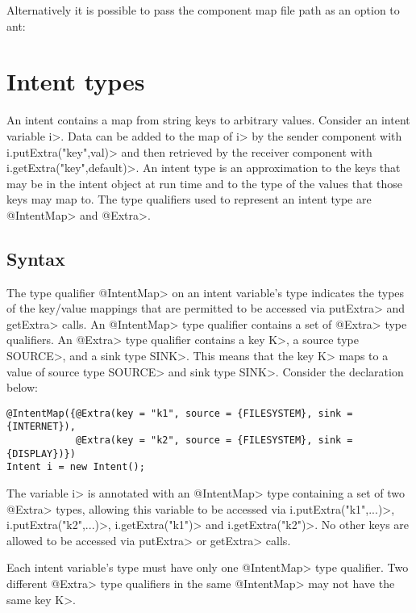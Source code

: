 
\noindent
Alternatively it is possible to pass the component map file path as an option
to ant:


\section{Intent types\label{intent-types}}
An intent contains a map from string keys to arbitrary values. Consider an
intent variable \<i>. Data can be added to the map of \<i> by
the sender component with \<i.putExtra("key",val)> and then retrieved by the
receiver component with \<i.getExtra("key",default)>. An intent type is an
approximation to the keys that may be in the intent object at run time and to
the type of the values that those keys may map to. The type qualifiers used to
represent an intent type are \<@IntentMap> and \<@Extra>.

\subsection{Syntax}
The type qualifier \<@IntentMap> on an intent variable's type indicates the
types of the key/value mappings that are permitted to be accessed via
\<putExtra> and \<getExtra> calls.
An \<@IntentMap> type qualifier contains a set of \<@Extra> type qualifiers. An
\<@Extra> type qualifier contains a key \<K>, a source type \<SOURCE>, and a 
sink type \<SINK>. This means that the key \<K> maps to a value of source type 
\<SOURCE> and sink type \<SINK>. Consider the declaration below:

\begin{Verbatim}
@IntentMap({@Extra(key = "k1", source = {FILESYSTEM}, sink = {INTERNET}),
            @Extra(key = "k2", source = {FILESYSTEM}, sink = {DISPLAY})}) 
Intent i = new Intent();
\end{Verbatim}

The variable \<i> is annotated with an \<@IntentMap> type containing a set of
two \<@Extra> types, allowing this variable to be accessed via
\<i.putExtra("k1",...)>, \<i.putExtra("k2",...)>, \<i.getExtra("k1")> and
\<i.getExtra("k2")>. No other keys are allowed to be accessed via
\<putExtra> or \<getExtra> calls. 

Each intent variable's type must have only one \<@IntentMap> type qualifier. Two
different \<@Extra> type qualifiers in the same \<@IntentMap> may not have the
same key \<K>.

